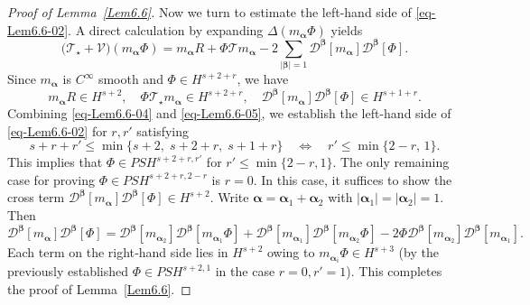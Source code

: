 \documentclass{sn-jnl}%
\numberwithin{equation}{section}
\theoremstyle{thmstyleone}%
\theoremstyle{thmstyletwo}%
\theoremstyle{thmstylethree}%
\begin{document}
\begin{proof}[Proof of Lemma~\ref{Lem6.6}]
      Now we turn to estimate the left-hand side of \eqref{eq-Lem6.6-02}. A direct calculation by expanding $\Delta (m_{\bm \alpha}\Phi)$ yields
        \begin{equation}\label{eq-Lem6.6-04}
            \bigl(\mathcal{T}_{\star}+\mathcal{V}\bigr)(m_{\bm \alpha}\Phi) =m_{\bm \alpha}R + \Phi \mathcal{T}m_{\bm \alpha} -            2\sum_{|\bm \beta|=1}\mathcal{D}^{\bm \beta}[m_{\bm \alpha}]\mathcal{D}^{\bm \beta}[\Phi].
        \end{equation}
        Since $m_{\bm \alpha}$ is $C^{\infty}$ smooth and $\Phi\in H^{s+2+r}$, we have
        \begin{equation}\label{eq-Lem6.6-05}
            m_{\bm \alpha} R \in H^{s+2},\quad \Phi \mathcal{T}_{\star}m_{\bm \alpha} \in H^{s+2+r},\quad \mathcal{D}^{\bm \beta}[m_{\bm \alpha}]\mathcal{D}^{\bm \beta}[\Phi]\in H^{s+1+r}.
        \end{equation}
       Combining \eqref{eq-Lem6.6-04} and \eqref{eq-Lem6.6-05}, we establish the left-hand side of \eqref{eq-Lem6.6-02} for $r,r'$ satisfying
        \[
        s+r+r' \le \min\{s+2,\; s+2+r,\; s+1+r\}
        \quad \Longleftrightarrow \quad
        r' \le \min\{2-r,\,1\}.
        \]
        This implies that $\Phi \in PSH^{s+2+r,r'}$ for $r' \le \min\{2-r,1\}$. The only remaining case for proving $\Phi \in PSH^{s+2+r,2-r}$ is $r=0$.
        In this case, it suffices to show the cross term
        $\mathcal{D}^{\bm \beta}[m_{\bm \alpha}]\mathcal{D}^{\bm \beta}[\Phi] \in H^{s+2}.$
        Write $\bm \alpha = \bm \alpha_1 +\bm \alpha_2$ with $|\bm \alpha_1|=|\bm \alpha_2|=1$. Then 
        \[
        \mathcal{D}^{\bm \beta}[m_{\bm \alpha}]
        \mathcal{D}^{\bm \beta}[\Phi]
        = 
        \mathcal{D}^{\bm \beta}[m_{\bm \alpha_2}]
        \mathcal{D}^{\bm \beta}[m_{\bm \alpha_1}\Phi]
        +
        \mathcal{D}^{\bm \beta}[m_{\bm \alpha_1}]
        \mathcal{D}^{\bm \beta}[m_{\bm \alpha_2}\Phi]
        -2
        \Phi\mathcal{D}^{\bm \beta}[m_{\bm \alpha_2}]
        \mathcal{D}^{\bm \beta}[m_{\bm \alpha_1}].\]
        Each term on the right‑hand side lies in  $H^{s+2}$ owing to $m_{\bm \alpha_i}\Phi\in H^{s+3}$ (by the previously established $\Phi \in PSH^{s+2,1}$ in the case $r=0,r'=1$). This completes the proof of  Lemma~\ref{Lem6.6}.
\end{proof}
\end{document}
